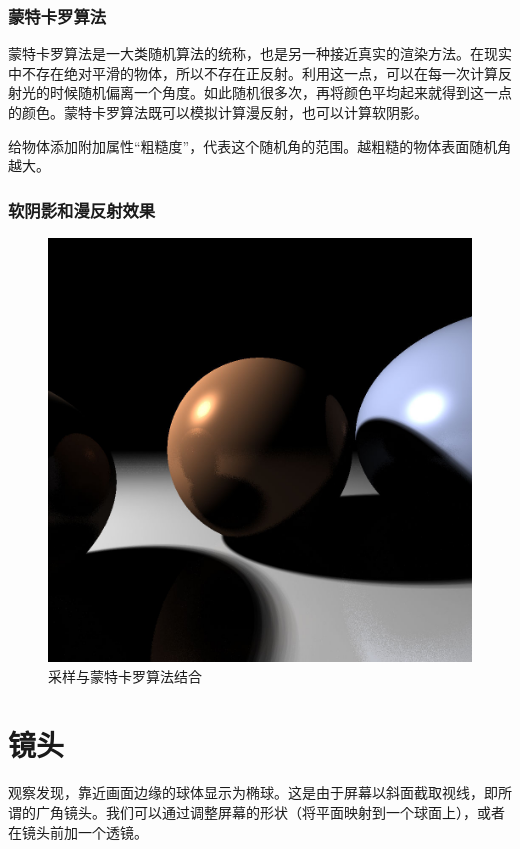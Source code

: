 \documentclass[10pt,twocolumn]{article}
\begin{document}
\subsubsection{\hei 蒙特卡罗算法}
蒙特卡罗算法是一大类随机算法的统称，也是另一种接近真实的渲染方法。在现实中不存在绝对平滑的物体，所以不存在正反射。利用这一点，可以在每一次计算反射光的时候随机偏离一个角度。如此随机很多次，再将颜色平均起来就得到这一点的颜色。蒙特卡罗算法既可以模拟计算漫反射，也可以计算软阴影。

给物体添加附加属性“粗糙度”，代表这个随机角的范围。越粗糙的物体表面随机角越大。

\subsubsection{\hei 软阴影和漫反射效果}
\begin{figure}[ht]
\centering
\includegraphics[scale=.18]{fig6.jpg}
\caption{采样与蒙特卡罗算法结合}
\end{figure}

\section{\hei 镜头}
观察发现，靠近画面边缘的球体显示为椭球。这是由于屏幕以斜面截取视线，即所谓的广角镜头。我们可以通过调整屏幕的形状（将平面映射到一个球面上），或者在镜头前加一个透镜。
\end{document}
